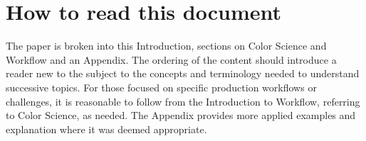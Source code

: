 \section{How to read this document}

The paper is broken into this Introduction, sections on Color Science and Workflow and an Appendix. The ordering of the content should introduce a reader new to the subject to the concepts and terminology needed to understand successive topics. For those focused on specific production workflows or challenges, it is reasonable to follow from the Introduction to Workflow, referring to Color Science, as needed. The Appendix provides more applied examples and explanation where it was deemed appropriate.


